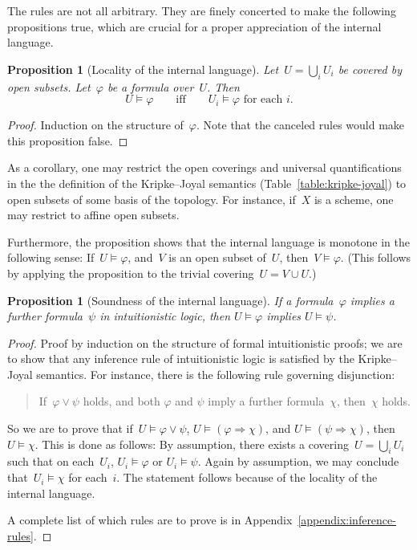 \documentclass[10pt]{amsart}
\theoremstyle{definition}
\theoremstyle{plain}
\newtheorem{prop}[defn]{Proposition}
\theoremstyle{remark}
\newcommand{\?}{\,{:}\,}
\renewcommand{\_}{\mathpunct{.}\,}
\begin{document}
The rules are not all arbitrary. They are finely concerted to make the
following propositions true, which are crucial for a proper appreciation of the
internal language.

\begin{prop}[Locality of the internal language]
Let~$U = \bigcup_i U_i$ be covered by open subsets. Let~$\varphi$
be a formula over~$U$. Then
\[ U \models \varphi \qquad\text{iff}\qquad
  \text{$U_i \models \varphi$ for each $i$}. \]
\end{prop}
\begin{proof}Induction on the structure of~$\varphi$. Note that the canceled
rules would make this proposition false.\end{proof}

As a corollary, one may restrict the open coverings and universal
quantifications in the the definition of the Kripke--Joyal semantics
(Table~\ref{table:kripke-joyal}) to open subsets of some basis of the topology.
For instance, if~$X$ is a scheme, one may restrict to affine open subsets.

Furthermore, the proposition shows that the internal language is monotone in
the following sense: If~$U \models \varphi$, and~$V$ is an open subset of~$U$,
then~$V \models \varphi$. (This follows by applying the proposition to the
trivial covering~$U = V \cup U$.)

\begin{prop}[Soundness of the internal language]
If a formula~$\varphi$ implies a further formula~$\psi$ in intuitionistic logic, then
$U \models \varphi$ implies $U \models \psi$.
\end{prop}
\begin{proof}
Proof by induction on the structure of formal intuitionistic proofs; we are to
show that any inference rule of intuitionistic logic is satisfied by the
Kripke--Joyal semantics. For instance, there is the following rule governing
disjunction:
\begin{quote}
If~$\varphi \vee \psi$ holds, and both $\varphi$ and $\psi$ imply a further
formula~$\chi$, then~$\chi$ holds.
\end{quote}
So we are to prove that if~$U \models \varphi \vee \psi$, $U \models (\varphi
\Rightarrow \chi)$, and $U \models (\psi \Rightarrow \chi)$, then $U \models \chi$.
This is done as follows: By assumption, there exists a covering~$U = \bigcup_i
U_i$ such that on each~$U_i$, $U_i \models \varphi$ or $U_i \models \psi$.
Again by assumption, we may conclude that~$U_i \models \chi$ for each~$i$. The statement
follows because of the locality of the internal language.

A complete list of which rules are to prove is
in Appendix~\ref{appendix:inference-rules}.
\end{proof}
\end{document}
